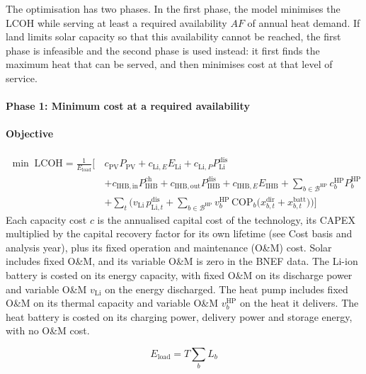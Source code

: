 \documentclass[11pt]{article}
\newcommand{\Li}{\mathrm{Li}}
\newcommand{\IHB}{\mathrm{IHB}}
\newcommand{\HP}{\mathrm{HP}}
\newcommand{\PV}{\mathrm{PV}}
\newcommand{\ch}{\mathrm{ch}}
\newcommand{\dis}{\mathrm{dis}}
\newcommand{\Eload}{E_{\mathrm{load}}}
\begin{document}
The optimisation has two phases. In the first phase, the model minimises the LCOH while serving at least a required availability $AF$ of annual heat demand. If land limits solar capacity so that this availability cannot be reached, the first phase is infeasible and the second phase is used instead: it first finds the maximum heat that can be served, and then minimises cost at that level of service.

\paragraph*{Phase 1: Minimum cost at a required availability}

\paragraph*{Objective}

\begin{equation}
\begin{split}
\min\; \mathrm{LCOH} = \frac{1}{\Eload}\Big[\, & c_{\PV}P_{\PV} + c_{\Li,E}E_{\Li} + c_{\Li,P}P_{\Li}^{\dis} \\
 & + c_{\IHB,\mathrm{in}}P_{\IHB}^{\ch} + c_{\IHB,\mathrm{out}}P_{\IHB}^{\dis} + c_{\IHB,E}E_{\IHB} + \sum_{b \in \mathcal{B}^{\HP}} c_{b}^{\HP}P_{b}^{\HP} \\
 & + \sum_{t} \Big( v_{\Li}\, p_{\Li,t}^{\dis} + \sum_{b \in \mathcal{B}^{\HP}} v_{b}^{\HP}\, \mathrm{COP}_{b} \big( x_{b,t}^{\mathrm{dir}} + x_{b,t}^{\mathrm{batt}} \big) \Big) \Big]
\end{split}
\label{eq:objective}
\end{equation}
Each capacity cost $c$ is the annualised capital cost of the technology, its CAPEX multiplied by the capital recovery factor for its own lifetime (see Cost basis and analysis year), plus its fixed operation and maintenance (O\&M) cost. Solar includes fixed O\&M, and its variable O\&M is zero in the BNEF data. The Li-ion battery is costed on its energy capacity, with fixed O\&M on its discharge power and variable O\&M $v_{\Li}$ on the energy discharged. The heat pump includes fixed O\&M on its thermal capacity and variable O\&M $v_{b}^{\HP}$ on the heat it delivers. The heat battery is costed on its charging power, delivery power and storage energy, with no O\&M cost.

\begin{equation}
\Eload = T\sum_{b} L_{b}
\label{eq:eload}
\end{equation}
\end{document}

